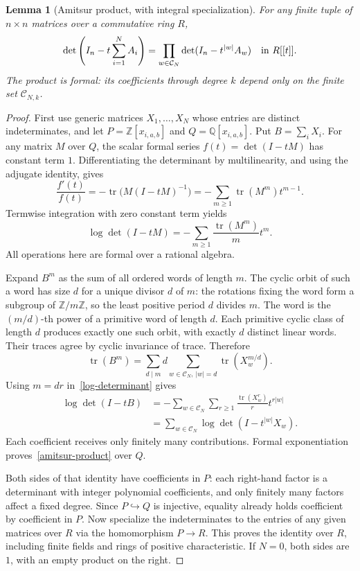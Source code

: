 \documentclass[11pt]{article}
\newcommand{\tr}{\operatorname{tr}}
\newtheorem{lemma}[theorem]{Lemma}
\begin{document}
\begin{lemma}[Amitsur product, with integral specialization]\label{product}
For any finite tuple of $n\times n$ matrices over a commutative ring $R$,
\begin{equation}\label{amitsur-product}
 \det\left(I_n-t\sum_{i=1}^N A_i\right)
       =\prod_{w\in\mathcal C_N}\det(I_n-t^{|w|}A_w)
       \quad\hbox{in }R[[t]].
\end{equation}
The product is formal: its coefficients through degree $k$ depend only
on the finite set $\mathcal C_{N,k}$.
\end{lemma}
\begin{proof}
First use generic matrices $X_1,\ldots,X_N$ whose entries are distinct
indeterminates, and let $P=\mathbb Z[x_{i,a,b}]$ and
$Q=\mathbb Q[x_{i,a,b}]$. Put $B=\sum_iX_i$.
For any matrix $M$ over $Q$, the scalar formal series
$f(t)=\det(I-tM)$ has constant term $1$. Differentiating the determinant
by multilinearity, and using the adjugate identity, gives
\[
 \frac{f'(t)}{f(t)}=-\tr\bigl(M(I-tM)^{-1}\bigr)
                 =-\sum_{m\geq1}\tr(M^m)t^{m-1}.
\]
Termwise integration with zero constant term yields
\begin{equation}\label{log-determinant}
 \log\det(I-tM)=-\sum_{m\geq1}\frac{\tr(M^m)}{m}t^m.
\end{equation}
All operations here are formal over a rational algebra.

Expand $B^m$ as the sum of all ordered words of length $m$.
The cyclic orbit of such a word has size $d$ for a unique divisor $d$ of
$m$: the rotations fixing the word form a subgroup of
$\mathbb Z/m\mathbb Z$, so the least positive period $d$ divides $m$.
The word is the $(m/d)$-th power of a primitive word of length $d$.
Each primitive cyclic class of length $d$ produces exactly one such orbit,
with exactly $d$ distinct linear words. Their traces agree by cyclic
invariance of trace. Therefore
\begin{equation}\label{orbit-trace}
 \tr(B^m)=\sum_{d\mid m}d
                \sum_{w\in\mathcal C_N,\ |w|=d}
                       \tr(X_w^{m/d}).
\end{equation}
Using $m=dr$ in~\eqref{log-determinant} gives
\[
 \begin{aligned}
 \log\det(I-tB)
   &=-\sum_{w\in\mathcal C_N}\sum_{r\geq1}
                    \frac{\tr(X_w^r)}r t^{r|w|}\\
   &=\sum_{w\in\mathcal C_N}\log\det(I-t^{|w|}X_w).
 \end{aligned}
\]
Each coefficient receives only finitely many contributions. Formal
exponentiation proves~\eqref{amitsur-product} over $Q$.

Both sides of that identity have coefficients in $P$: each right-hand
factor is a determinant with integer polynomial coefficients, and only
finitely many factors affect a fixed degree. Since $P\hookrightarrow Q$
is injective, equality already holds coefficient by coefficient in $P$.
Now specialize the indeterminates to the entries of any given matrices
over $R$ via the homomorphism $P\to R$. This proves the identity over $R$,
including finite fields and rings of positive characteristic. If $N=0$,
both sides are $1$, with an empty product on the right.
\end{proof}
\end{document}
